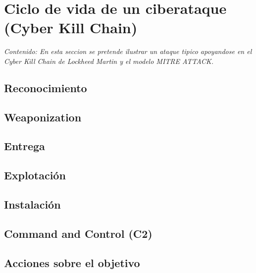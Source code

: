 \chapter{Ciclo de vida de un ciberataque (Cyber Kill Chain)}

\textit{Contenido: En esta seccion se pretende ilustrar un ataque tipico
apoyandose en el Cyber Kill Chain de Lockheed Martin y el modelo MITRE ATTACK.}
\vspace{1em}

\section{Reconocimiento}

\section{Weaponization}

\section{Entrega}

\section{Explotación}

\section{Instalación}

\section{Command and Control (C2)}

\section{Acciones sobre el objetivo}